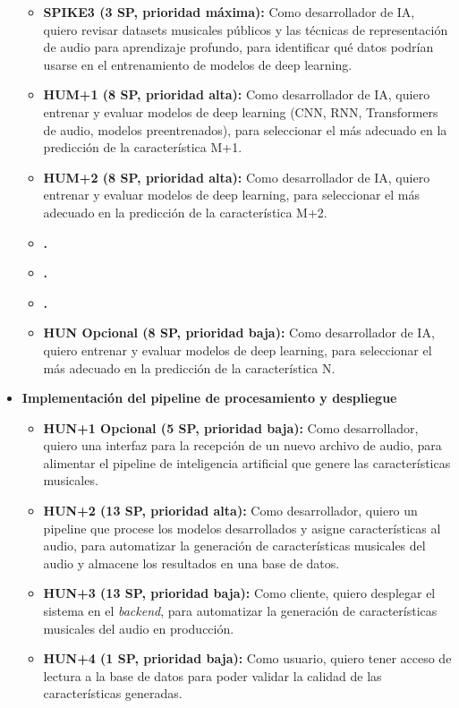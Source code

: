 \documentclass[
11pt, %
]{charter}
\begin{document}
\begin{itemize}
\begin{itemize}
      \item \textbf{SPIKE3 (3 SP, prioridad máxima):}
      Como desarrollador de IA, quiero revisar {datasets} musicales públicos y las técnicas de representación de audio para aprendizaje profundo, para identificar qué datos podrían usarse en el entrenamiento de modelos de deep learning.
      \item \textbf{HUM+1 (8 SP, prioridad alta):}
      Como desarrollador de IA, quiero entrenar y evaluar modelos de deep learning (CNN, RNN, Transformers de audio, modelos preentrenados), para seleccionar el más adecuado en la predicción de la característica M+1.
      \item \textbf{HUM+2 (8 SP, prioridad alta):}
      Como desarrollador de IA, quiero entrenar y evaluar modelos de deep learning, para seleccionar el más adecuado en la predicción de la característica M+2.
      \item \textbf{.}
      \item \textbf{.}
      \item \textbf{.}
      \item \textbf{HUN Opcional (8 SP, prioridad baja):}
      Como desarrollador de IA, quiero entrenar y evaluar modelos de deep learning, para seleccionar el más adecuado en la predicción de la característica N.
    \end{itemize}
  \item \textbf{Implementación del pipeline de procesamiento y despliegue}
    \begin{itemize}
      \item \textbf{HUN+1 Opcional (5 SP, prioridad baja):}
      Como desarrollador, quiero una interfaz para la recepción de un nuevo archivo de audio, para alimentar el pipeline de inteligencia artificial que genere las características musicales.
      \item \textbf{HUN+2 (13 SP, prioridad alta):}
      Como desarrollador, quiero un pipeline que procese los modelos desarrollados y asigne características al audio, para automatizar la generación de características musicales del audio y almacene los resultados en una base de datos.
      \item \textbf{HUN+3 (13 SP, prioridad baja):}
      Como cliente, quiero desplegar el sistema en el \textit{backend}, para automatizar la generación de características musicales del audio en producción.
      \item \textbf{HUN+4 (1 SP, prioridad baja):}
      Como usuario, quiero tener acceso de lectura a la base de datos para poder validar la calidad de las características generadas.
    \end{itemize}
\end{itemize}
\end{document}
